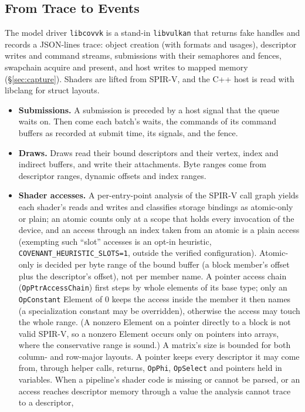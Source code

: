 \documentclass[acmtog,anonymous,review]{acmart}
\newcommand{\code}[1]{\texttt{#1}}
\begin{document}
\subsection{From Trace to Events}
\label{sec:impl}
The model driver \code{libcovvk} is a stand-in \code{libvulkan} that returns fake handles and records a JSON-lines
trace: object creation (with formats and usages), descriptor writes and command streams, submissions with their
semaphores and fences, swapchain acquire and present, and host writes to mapped memory (\S\ref{sec:capture}). Shaders
are lifted from SPIR-V, and the C++ host is read with libclang for struct layouts.
\begin{itemize}
\item \textbf{Submissions.} A submission is preceded by a host signal that the queue waits on. Then come each
  batch's waits, the commands of its command buffers as recorded at submit time, its signals, and the fence.
\item \textbf{Draws.} Draws read their bound descriptors and their vertex, index and indirect buffers, and write
  their attachments. Byte ranges come from descriptor ranges, dynamic offsets and index ranges.
\item \textbf{Shader accesses.} A per-entry-point analysis of the SPIR-V call graph yields each shader's reads and
  writes and classifies storage bindings as atomic-only or plain; an atomic counts only at a scope that holds
  every invocation of the device, and an access through an index taken from an atomic is a plain access (exempting
  such ``slot'' accesses is an opt-in heuristic, \code{COVENANT\_HEURISTIC\_SLOTS=1}, outside the verified
  configuration). Atomic-only is decided per byte range of the bound buffer (a block member's offset plus the
  descriptor's offset), not per member name. A pointer access chain (\code{OpPtrAccessChain}) first steps by whole
  elements of its base type; only an \code{OpConstant} Element of 0 keeps the access inside the member it then names (a specialization constant may be overridden),
  otherwise the access may touch the whole range. (A nonzero Element on a pointer directly to a block is not valid
  SPIR-V, so a nonzero Element occurs only on pointers into arrays, where the conservative range is sound.) A matrix's size is bounded for both column- and row-major
  layouts. A pointer keeps every descriptor it may come from, through helper calls,
  returns, \code{OpPhi}, \code{OpSelect} and pointers held in variables. When a pipeline's shader code is missing or
  cannot be parsed, or an access reaches descriptor memory through a value the analysis cannot trace to a descriptor,

\end{itemize}
\end{document}
